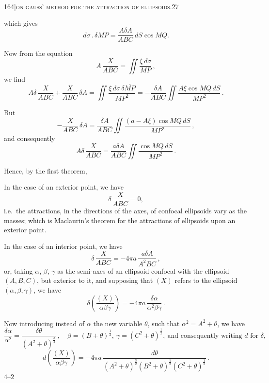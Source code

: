 \documentclass[11pt]{article}
\begin{document}
\newpage

\begin{center}
\small 164]\hfill\textsc{on gauss' method for the attraction of ellipsoids.}\hfill\textsc{27}
\end{center}

\medskip

\noindent which gives
\[
d\sigma\,.\,\delta MP = \frac{A\delta A}{ABC}\,dS\cos MQ.
\]

Now from the equation
\[
A\,\frac{X}{ABC} = \iint\frac{\xi\,d\sigma}{MP}\,,
\]
we find
\[
A\delta\,\frac{X}{ABC} + \frac{X}{ABC}\,\delta A = \iint\frac{\xi\,d\sigma\,\delta\overline{MP}}{MP^{2}}
= -\frac{\delta A}{ABC}\iint\frac{A\xi\cos MQ\,dS}{MP^{2}}\,.
\]

But
\[
-\frac{X}{ABC}\,\delta A = \frac{\delta A}{ABC}\iint\frac{(a - A\xi)\cos MQ\,dS}{MP^{2}}\,,
\]
and consequently
\[
A\delta\,\frac{X}{ABC} = \frac{a\delta A}{ABC}\iint\frac{\cos MQ\,dS}{MP^{2}}\,.
\]

Hence, by the first theorem,

In the case of an exterior point, we have
\[
\delta\,\frac{X}{ABC} = 0,
\]
i.e.\ the attractions, in the directions of the axes, of confocal ellipsoids vary as the masses;
which is Maclaurin's theorem for the attractions of ellipsoids upon an exterior point.

In the case of an interior point, we have
\[
\delta\,\frac{X}{ABC} = -4\pi a\,\frac{a\delta A}{A^{2}BC}\,,
\]
or, taking $\alpha$, $\beta$, $\gamma$ as the semi-axes of an ellipsoid confocal with the ellipsoid $(A, B, C)$,
but exterior to it, and supposing that $(X)$ refers to the ellipsoid $(\alpha, \beta, \gamma)$, we have
\[
\delta\!\left(\frac{(X)}{\alpha\beta\gamma}\right) = -4\pi a\,\frac{\delta\alpha}{\alpha^{2}\beta\gamma}\,.
\]

Now introducing instead of $\alpha$ the new variable $\theta$, such that $\alpha^{2} = A^{2} + \theta$, we have
\[
\frac{\delta\alpha}{\alpha^{2}} = \frac{\delta\theta}{(A^{2} + \theta)^{\frac{3}{2}}}\,,\quad \beta = (B + \theta)^{\frac{1}{2}},\ \gamma = (C^{2} + \theta)^{\frac{1}{2}},\ \text{and consequently writing } d \text{ for } \delta,
\]
\[
d\!\left(\frac{(X)}{\alpha\beta\gamma}\right) = -4\pi a\,\frac{d\theta}{(A^{2} + \theta)^{\frac{3}{2}}(B^{2} + \theta)^{\frac{1}{2}}(C^{2} + \theta)^{\frac{1}{2}}}\,.
\]
\hfill $4$--$2$
\end{document}
